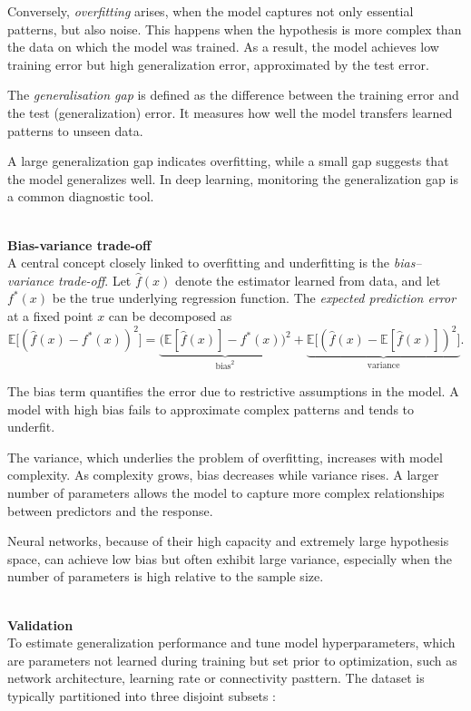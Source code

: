 Conversely, \textit{overfitting} arises, when the model captures not only essential patterns, but also noise. This happens when the hypothesis is more complex than the data on which the model was trained. As a result, the model achieves low training error but high generalization error, approximated by the test error.

The \textit{generalisation gap} is defined as the difference between the training error and the test (generalization) error. It measures how well the model transfers learned patterns to unseen data.

A large generalization gap indicates overfitting, while a small gap suggests that the model generalizes well. In deep learning, monitoring the generalization gap \break is a common diagnostic tool.

\textbf{\\Bias-variance trade-off\\}
A central concept closely linked to overfitting and underfitting is the \emph{bias–variance trade-off}. Let 
\(\hat f(x)\) denote the estimator learned from data, and let \(f^\ast(x)\) be the true underlying regression function. The \emph{expected prediction error} at a fixed point \(x\) can be decomposed as
\begin{equation*}
    \mathbb{E}\big[(\hat f(x) - f^\ast(x))^2\big]
    =
    \underbrace{\big(\mathbb{E}[\hat f(x)] - f^\ast(x)\big)^2}_{\text{bias}^2}
    +
    \underbrace{\mathbb{E}\big[(\hat f(x) - \mathbb{E}[\hat f(x)])^2\big]}_{\text{variance}}.
\end{equation*}

The bias term quantifies the error due to restrictive assumptions in the model. \break A model with high bias fails to approximate complex patterns and tends to underfit.

The variance, which underlies the problem of overfitting, increases with model complexity. As complexity grows, bias decreases while variance rises. A larger number of parameters allows the model to capture more complex relationships between predictors and the response.

Neural networks, because of their high capacity and extremely large hypothesis space, can achieve low bias but often exhibit large variance, especially when the number of parameters is high relative to the sample size. 

\textbf{\\Validation\\}
To estimate generalization performance and tune model hyperparameters, which are parameters not learned during training but set prior to optimization, such as network architecture, learning rate or connectivity pasttern. The dataset is typically partitioned into three disjoint subsets \cite{goodfellow2016}:

